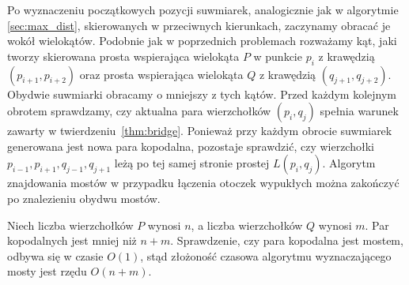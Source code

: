 Po wyznaczeniu początkowych pozycji suwmiarek, analogicznie jak w
algorytmie \ref{sec:max_dist}, skierowanych w przeciwnych kierunkach,
zaczynamy obracać je wokół wielokątów. Podobnie jak w poprzednich
problemach rozważamy kąt, jaki tworzy skierowana prosta wspierająca
wielokąta $P$ w punkcie $p_i$ z krawędzią $(p_{i+1}, p_{i+2})$ oraz
prosta wspierająca wielokąta $Q$ z krawędzią $(q_{j+1},
q_{j+2})$. Obydwie suwmiarki obracamy o mniejszy z tych kątów. Przed
każdym kolejnym obrotem sprawdzamy, czy aktualna para wierzchołków
$(p_i, q_j)$ spełnia warunek zawarty w
twierdzeniu~\ref{thm:bridge}. Ponieważ przy każdym obrocie suwmiarek
generowana jest nowa para kopodalna, pozostaje sprawdzić, czy
wierzchołki $p_{i-1}, p_{i+1}, q_{j-1}, q_{j+1}$ leżą po tej samej
stronie prostej $L(p_i, q_j)$. Algorytm znajdowania mostów w przypadku
łączenia otoczek wypukłych można zakończyć po znalezieniu obydwu
mostów.

Niech liczba wierzchołków $P$ wynosi $n$, a liczba wierzchołków $Q$
wynosi $m$. Par kopodalnych jest mniej niż $n + m$. Sprawdzenie, czy
para kopodalna jest mostem, odbywa się w czasie $O(1)$, stąd złożoność
czasowa algorytmu wyznaczającego mosty jest rzędu $O(n + m)$.

